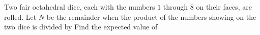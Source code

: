 Two fair octahedral dice, each with the numbers $1$ through $8$ on their faces, are rolled. Let $N$ be the remainder when the product of the numbers showing on the two dice is divided by  Find the expected value of 